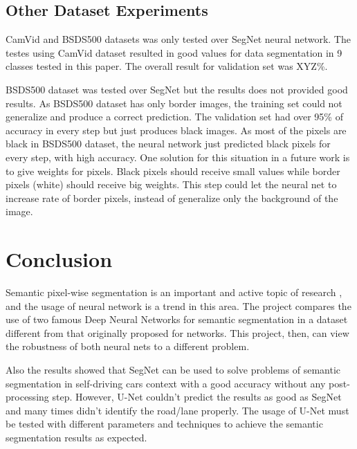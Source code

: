 \documentclass[10pt,twocolumn,letterpaper]{article}
\begin{document}
\subsection{Other Dataset Experiments} \label{ssec:other_experiments}

CamVid and BSDS500 datasets was only tested over SegNet neural network. The testes using CamVid dataset resulted in good values for data segmentation in 9 classes tested in this paper. The overall result for validation set was XYZ\%.

BSDS500 dataset was tested over SegNet but the results does not provided good results. As BSDS500 dataset has only border images, the training set could not generalize and produce a correct prediction. The validation set had over 95\% of accuracy in every step but just produces black images. As most of the pixels are black in BSDS500 dataset, the neural network just predicted black pixels for every step, with high accuracy. One solution for this situation in a future work is to give weights for pixels. Black pixels should receive small values while border pixels (white) should receive big weights. This step could let the neural net to increase rate of border pixels, instead of generalize only the background of the image.

\section{Conclusion} \label{sec:conclusion}


Semantic pixel-wise segmentation is an important and active topic of research \cite{SEGNET}, and the usage of neural network is a trend in this area. The project compares the use of two famous Deep Neural Networks for semantic segmentation in a dataset different from that originally proposed for networks. This project, then, can view the robustness of both neural nets to a different problem. 

Also the results showed that SegNet can be used to solve problems of semantic segmentation in self-driving cars context with a good accuracy without any post-processing step. However, U-Net couldn't predict the results as good as SegNet and many times didn't identify the road/lane properly. The usage of U-Net must be tested with different parameters and techniques to achieve the semantic segmentation results as expected.
\end{document}
